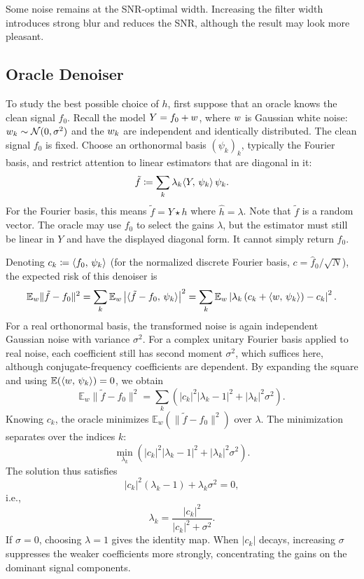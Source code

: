 Some noise remains at the SNR-optimal width. Increasing the filter width introduces strong blur and reduces the SNR, although the result may look more pleasant.


\subsection{Oracle Denoiser}

To study the best possible choice of $h$, first suppose that an oracle knows the clean signal $f_0$.
%
Recall the model $Y = f_0 + w$, where $w$ is Gaussian white noise: $w_k \sim \mathcal{N}(0, \sigma^2)$ and the $w_k$ are independent and identically distributed. The clean signal $f_0$ is fixed. Choose an orthonormal basis $(\psi_k)_k$, typically the Fourier basis, and restrict attention to linear estimators that are diagonal in it:
\begin{equation}\label{eq:linear-denoiser}
	\tilde{f} \coloneqq \sum_k \lambda_k \langle Y,\,\psi_k\rangle \, \psi_k.
\end{equation}
For the Fourier basis, this means $\tilde{f} = Y \star h$ where $\hat h=\lambda$. Note that $\tilde{f}$ is a random vector.
%
The oracle may use $f_0$ to select the gains $\lambda$, but the estimator must still be linear in $Y$ and have the displayed diagonal form. It cannot simply return $f_0$.

Denoting $c_k \coloneqq \langle f_0,\,\psi_k\rangle$ (for the normalized discrete Fourier basis, $c=\hat f_0/\sqrt N$), the expected risk of this denoiser is
$$
	\mathbb{E}_w \|\tilde{f} - f_0\|^2 = \sum_k \mathbb{E}_w \left| \langle \tilde{f} - f_0,\,\psi_k\rangle \right|^2  = \sum_k \mathbb{E}_w  \left| \lambda_k \left( c_k + \langle w,\,\psi_k\rangle \right) - c_k \right|^2 .
$$
For a real orthonormal basis, the transformed noise is again independent Gaussian noise with variance $\sigma^2$. For a complex unitary Fourier basis applied to real noise, each coefficient still has second moment $\sigma^2$, which suffices here, although conjugate-frequency coefficients are dependent. By expanding the square and using $\mathbb{E}(\langle w,\,\psi_k\rangle) = 0$, we obtain
$$
\mathbb{E}_w  \|\tilde{f} - f_0\|^2  = \sum_k\left(|c_k|^2|\lambda_k-1|^2+|\lambda_k|^2\sigma^2\right) .
$$
Knowing $c_k$, the oracle minimizes $\mathbb{E}_w \left( \|\tilde{f} - f_0\|^2 \right)$ over $\lambda$. The minimization separates over the indices $k$:
$$
	\min_{\lambda_k} \left( |c_k|^2 |\lambda_k - 1|^2 + |\lambda_k|^2 \sigma^2 \right).
$$
The solution thus satisfies
$$
	|c_k|^2 (\lambda_k - 1) + \lambda_k \sigma^2 = 0,
$$
i.e.,
$$
	\lambda_k = \frac{|c_k|^2}{|c_k|^2+\sigma^2}.
$$
If $\sigma = 0$, choosing $\lambda = 1$ gives the identity map. When $|c_k|$ decays, increasing $\sigma$ suppresses the weaker coefficients more strongly, concentrating the gains on the dominant signal components.



